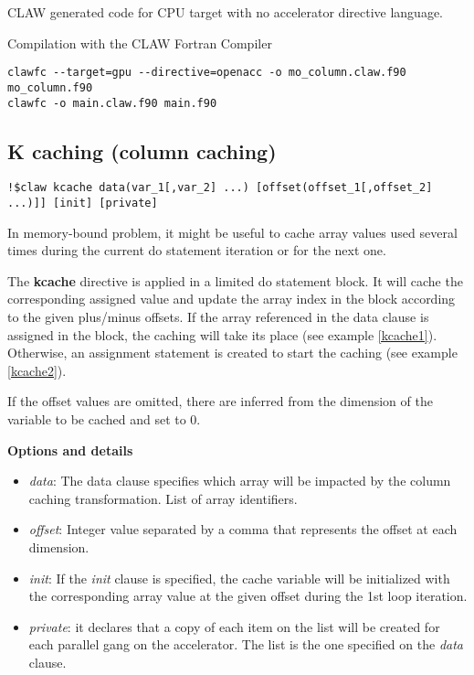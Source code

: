 CLAW generated code for CPU target with no accelerator directive language.


Compilation with the CLAW Fortran Compiler
\begin{lstlisting}
clawfc --target=gpu --directive=openacc -o mo_column.claw.f90 mo_column.f90
clawfc -o main.claw.f90 main.f90
\end{lstlisting}

\subsection{K caching (column caching)}
\begin{lstlisting}
!$claw kcache data(var_1[,var_2] ...) [offset(offset_1[,offset_2] ...)]] [init] [private]
\end{lstlisting}

In memory-bound problem, it might be useful to cache array values used several
times during the current do statement iteration or for the next one.

The \textbf{kcache} directive is applied in a limited do statement block. It
will cache the corresponding assigned value and update the array index in the
block according to the given plus/minus offsets. If the array referenced in the
data clause is assigned in the block, the caching will take its place (see
example \ref{kcache1}). Otherwise, an assignment statement is created to start
the caching (see example \ref{kcache2}).

If the offset values are omitted, there are inferred from the dimension of the
variable to be cached and set to 0.

\textbf{Options and details}
\begin{itemize}
\item \textit{data}: The data clause specifies which array will be impacted by
the column caching transformation. List of array identifiers.
\item \textit{offset}: Integer value separated by a comma that represents the
offset at each dimension.
\item \textit{init}: If the \textit{init} clause is specified, the cache
variable will be initialized with the corresponding array value at the given
offset during the 1st loop iteration.
\item \textit{private}: it declares that a copy of each item on the list will
be created for each parallel gang on the accelerator. The list is the one
specified on the \textit{data} clause.
\end{itemize}

